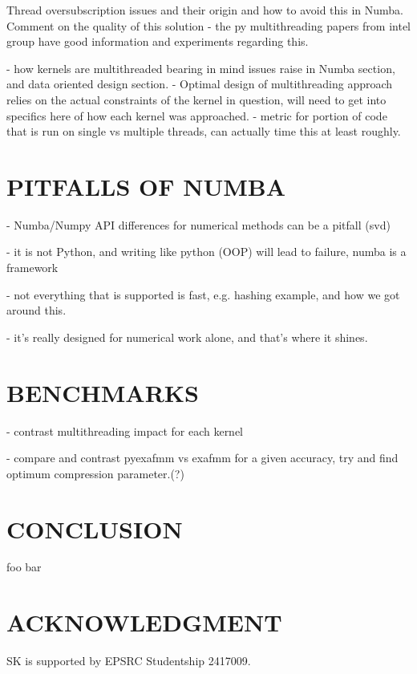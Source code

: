 \documentclass{IEEEcsmag}
\begin{document}
Thread oversubscription issues and their origin and how to avoid this in Numba. Comment on the quality of this solution - the py multithreading papers from intel group have good information and experiments regarding this.

- how kernels are multithreaded bearing in mind issues raise in Numba section, and data oriented design section.
- Optimal design of multithreading approach relies on the actual constraints of the kernel in question, will need to get into specifics here of how each kernel was approached.
- metric for portion of code that is run on single vs multiple threads, can actually time this at least roughly.

\section{PITFALLS OF NUMBA}

- Numba/Numpy API differences for numerical methods can be a pitfall (svd)

- it is not Python, and writing like python (OOP) will lead to failure, numba is a framework

- not everything that is supported is fast, e.g. hashing example, and how we got around this.

- it's really designed for numerical work alone, and that's where it shines.

\section{BENCHMARKS}

- contrast multithreading impact for each kernel

- compare and contrast pyexafmm vs exafmm for a given accuracy, try and find optimum compression parameter.(?)

\section{CONCLUSION}

foo bar

\section{ACKNOWLEDGMENT}

SK is supported by EPSRC Studentship 2417009.




\end{document}
